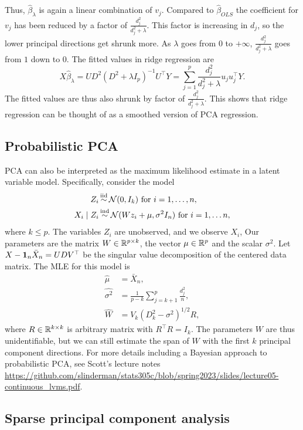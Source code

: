 Thus, $\hat{\beta}_\lambda$ is again a linear combination of $v_j$. Compared to $\hat{\beta}_{OLS}$ the coefficient for $v_j$ has been reduced by a factor of $\frac{d_j^2}{d_j^2+\lambda}$. This factor is increasing in $d_j$, so the lower principal directions get shrunk more. As $\lambda$ goes from $0$ to $+\infty$, $\frac{d_j^2}{d_j^2+\lambda}$ goes from $1$ down to $0$. The fitted values in ridge regression are
\[X\hat{\beta}_\lambda = UD^2(D^2+\lambda I_p)^{-1}U^\top Y = \sum_{j=1}^p \frac{d_j^2}{d_j^2+\lambda} u_ju_j^\top  Y. \]
The fitted values are thus also shrunk by factor of $\frac{d_j^2}{d_j^2+\lambda}$. This shows that ridge regression can be thought of as a smoothed version of PCA regression.


\subsection{Probabilistic PCA}

PCA can also be interpreted as the maximum likelihood estimate in a latent variable model. Specifically, consider the model
\begin{align*}
    Z_i &\simiid \calN(0,I_k) \text{ for } i = 1,\ldots, n,\\
    X_i \mid Z_i & \simind \calN(Wz_i+\mu, \sigma^2I_n) \text{ for } i =1,\ldots n,
\end{align*}
where $k \le p$. The variables $Z_i$ are unobserved, and we observe $X_i$, Our parameters are the matrix $W \in \mathbb{R}^{p \times k}$, the vector $\mu \in \mathbb{R}^p$ and the scalar $\sigma^2$. Let $X - \mathbf 1_n\bar{X}_n = UDV^\top$ be the singular value decomposition of the centered data matrix. The MLE for this model is
\begin{align*}
    \hat{\mu}&=\bar{X}_n,\\
    \hat{\sigma^2}&=\frac{1}{p-k} \sum_{j=k+1}^p \frac{d_j^2}{n},\\
    \hat{W}&=V_k(D^2_k-\sigma^2)^{1/2}R,
\end{align*}
where $R\in \mathbb{R}^{k \times k}$ is arbitrary matrix with $R^\top R=I_k$. The parameters $W$ are thus unidentifiable, but we can still estimate the span of $W$ with the first $k$ principal component directions. For more details including a Bayesian approach to probabilistic PCA, see Scott's lecture notes \url{https://github.com/slinderman/stats305c/blob/spring2023/slides/lecture05-continuous_lvms.pdf}.


\subsection{Sparse principal component analysis}

